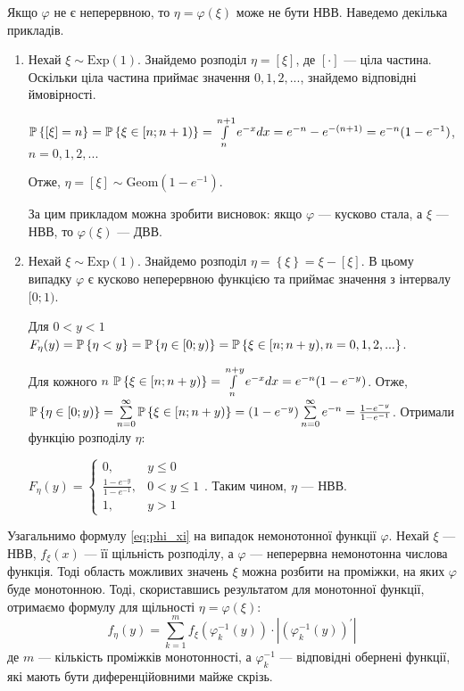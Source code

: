 \begin{remark}
    Якщо $\varphi$ не є неперервною, то $\eta = \varphi(\xi)$ може не бути НВВ. Наведемо декілька прикладів.
    \begin{enumerate}
        \item Нехай $\xi \sim \mathrm{Exp}(1)$. Знайдемо розподіл $\eta = \left[ \xi\right]$, де $\left[ \cdot\right]$ --- ціла частина.
        Оскільки ціла частина приймає значення $0, 1, 2, ...$, знайдемо відповідні ймовірності. 
        
        $\P\left\{ \left[ \xi\right] = n\right\} = \P\left\{ \xi \in [n; n+1)\right\} = \int\limits_n^{n+1} e^{-x} dx = e^{-n} - e^{-(n+1)} = e^{-n}(1 - e^{-1})$, $n = 0, 1, 2, ...$

        Отже, $\eta = \left[ \xi\right] \sim \mathrm{Geom}(1-e^{-1})$.

        За цим прикладом можна зробити висновок: якщо $\varphi$ --- кусково стала, а $\xi$ --- НВВ, то $\varphi(\xi)$ --- ДВВ.
        \item Нехай $\xi \sim \mathrm{Exp}(1)$. Знайдемо розподіл $\eta = \left\{ \xi\right\} = \xi - \left[ \xi\right]$. 
        В цьому випадку $\varphi$ є кусково неперервною функцією та приймає значення з інтервалу $[0; 1)$.
        
        Для $0< y < 1$ $F_\eta (y) = \P\left\{\eta < y\right\} = \P\left\{\eta \in [0; y)\right\} = \P\left\{\xi \in [n; n+y), n = 0, 1, 2, ...\right\}$.

        Для кожного $n$ $\P\left\{\xi \in [n; n+y)\right\} = \int\limits_n^{n+y} e^{-x} dx = e^{-n}(1 - e^{-y})$. 
        Отже, $\P\left\{\eta \in [0; y)\right\} = \sum\limits_{n=0}^{\infty} \P\left\{\xi \in [n; n+y)\right\} = (1 - e^{-y}) \sum\limits_{n=0}^{\infty} e^{-n} = \frac{1 - e^{-y}}{1 - e^{-1}}$. Отримали функцію розподілу $\eta$:

        $F_\eta (y) = \begin{cases}
            0, & y \leq 0 \\
            \frac{1 - e^{-y}}{1 - e^{-1}}, & 0 < y \leq 1 \\
            1, & y > 1
        \end{cases}$. Таким чином, $\eta$ --- НВВ.
    \end{enumerate}
\end{remark}

Узагальнимо формулу \eqref{eq:phi_xi} на випадок немонотонної функції $\varphi$.
Нехай $\xi$ --- НВВ, $f_\xi(x)$ --- її щільність розподілу, а $\varphi$ --- неперервна немонотонна числова функція.
Тоді область можливих значень $\xi$ можна розбити на проміжки, на яких $\varphi$ буде монотонною. 
Тоді, скориставшись результатом для монотонної функції, отримаємо формулу для щільності $\eta = \varphi(\xi)$:
\begin{equation}
    f_\eta (y) = \sum\limits_{k=1}^m f_\xi\left(\varphi_k^{-1} (y)\right) \cdot \left|\left(\varphi_k^{-1} (y) \right)^{\prime}\right|
\end{equation}
де $m$ --- кількість проміжків монотонності, а $\varphi_k^{-1}$ --- відповідні обернені функції, які мають бути диференційовними майже скрізь.

